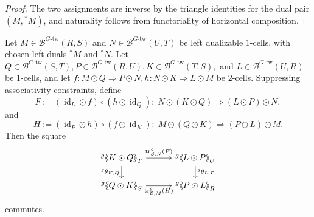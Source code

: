 \documentclass[11pt,oneside]{amsart}
\DeclareMathOperator{\id}{id}
\numberwithin{equation}{section}
\numberwithin{figure}{section}
\theoremstyle{plain}
\theoremstyle{definition}
\theoremstyle{remark}
\newcommand{\shspace}{\hspace{.5mm}} %
\newcommand{\sh}[1]{{\ensuremath{\shspace\hspace{1mm}\makebox[-1mm]{$\langle$}\makebox[0mm]{$\langle$}\hspace{1mm}{#1}\makebox[1mm]{$\rangle$}\makebox[0mm]{$\rangle$}\shspace}}}
\begin{document}
\begin{proof}
The two assignments are inverse by the triangle identities for the dual pair
\((M,{}^*M)\), and naturality follows from functoriality of horizontal
composition.
\end{proof}


 
\begin{prop}
\label{prop:twisted_sliding_general}
Let $M\in\mathcal B^{G\text{-tw}}(R,S)$ and
$N\in\mathcal B^{G\text{-tw}}(U,T)$ be left dualizable $1$-cells,
with chosen left duals ${}^*M$ and ${}^*N$.
Let
\(
Q\in\mathcal B^{G\text{-tw}}(S,T),
P\in\mathcal B^{G\text{-tw}}(R,U),
K\in\mathcal B^{G\text{-tw}}(T,S),\) and
\(L\in\mathcal B^{G\text{-tw}}(U,R)
\) be 1-cells, and let
\(
f:M\odot Q\Rightarrow P\odot N,
h:N\odot K\Rightarrow L\odot M
\)
be $2$-cells.
Suppressing associativity constraints, define
\[
F := (\id_L\odot f)\circ (h\odot \id_Q)
:\;
N\odot (K\odot Q)\Rightarrow (L\odot P)\odot N,
\]
and
\[
 H := (\id_P\odot h)\circ (f\odot \id_K)
:\;
M\odot (Q\odot K)\Rightarrow (P\odot L)\odot M.
\]
Then the square
\[
\begin{tikzcd}[row sep=1.5em, column sep=3em]
{}^g\sh{K \odot Q}_T 
  \arrow[r, "\operatorname{tr}_{\mathcal{B},N}^g(F)"] 
  \arrow[d, "{}^g\theta_{K,Q}"'] 
& {}^g\sh{L \odot P}_U
  \arrow[d, "{}^g\theta_{L,P}"] 
\\
{}^g\sh{Q \odot K}_S 
  \arrow[r, "\operatorname{tr}_{\mathcal{B},M}^g( H)"'] 
& {}^g\sh{P \odot L}_R
\end{tikzcd}
\]
commutes.
\end{prop}
\end{document}

